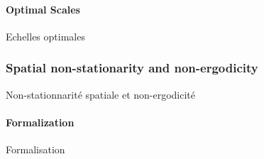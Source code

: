 \begin{figure}[h!]
\label{fig:staticcorrs:corrsdistrib}
\end{figure}



\paragraph{Optimal Scales}{Echelles optimales}







\subsubsection{Spatial non-stationarity and non-ergodicity}{Non-stationnarité spatiale et non-ergodicité}


\paragraph{Formalization}{Formalisation}

